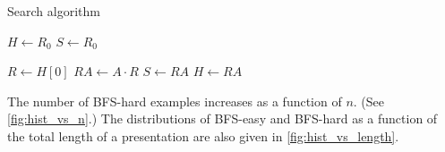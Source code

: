 \begin{algorithm}
	\caption{Search algorithm}\label{alg:bfs}
	\begin{algorithmic}
		\State $H \gets R_0$ 
		\State $S \gets R_0$ 

		 
		\State $R \gets H[0]$ 
		\State $RA \gets A \cdot R$ 
		\State $S \gets RA$
		\State $H \gets RA$ 

		\EndIf
		\EndFor
		\EndWhile
	\end{algorithmic}
\end{algorithm}

The number of BFS-hard examples increases as a function of $n$. (See \autoref{fig:hist_vs_n}.) The distributions of BFS-easy and BFS-hard as a function of the total length of a presentation are also given in \autoref{fig:hist_vs_length}.

